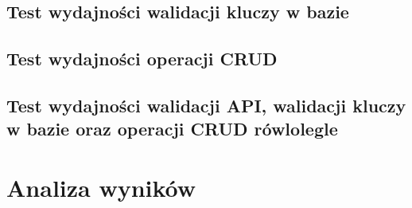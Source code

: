 \subsection{Test wydajności walidacji kluczy w bazie}
% 

\subsection{Test wydajności operacji CRUD}
% 

\subsection{Test wydajności walidacji API, walidacji kluczy w bazie oraz operacji CRUD rówlolegle }
% 

\newpage
\section{Analiza wyników}
